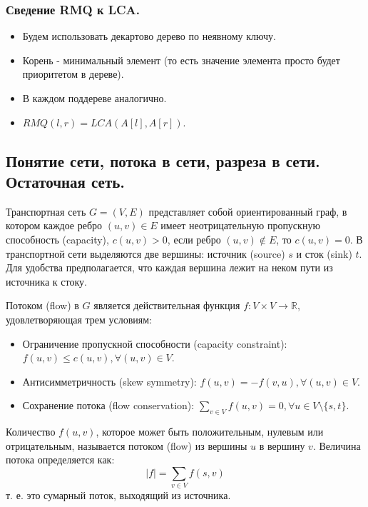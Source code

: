 \documentclass[a4paper,14pt]{article}
\begin{document}
    \subsubsection*{Сведение RMQ к LCA.}
    \begin{itemize}
        \item Будем использовать декартово дерево по неявному ключу.
        \item Корень - минимальный элемент (то есть значение элемента
        просто будет приоритетом в дереве).
        \item В каждом поддереве аналогично.
        \item $RMQ(l,r) = LCA(A[l],A[r])$.
    \end{itemize}

    \subsection{Понятие сети, потока в сети, разреза в сети. Остаточная сеть.}
    \label{subsec:flow_network}
    \begin{Def}
        Транспортная сеть $G = (V,E)$ представляет собой ориентированный
граф, в котором каждое ребро $(u,v) \in E$ имеет неотрицательную
пропускную способность (capacity), $c(u,v) > 0$, если ребро $(u,v) \notin E$,
то $c(u,v) = 0$. В транспортной сети выделяются две вершины:
источник (source) $s$ и сток (sink) $t$. Для удобства предполагается,
что каждая вершина лежит на неком пути из источника к стоку.
    \end{Def}
    \begin{Def}
        Потоком (flow) в $G$ является действительная функция
        $f : V\times V \rightarrow \mathbb{R}$, удовлетворяющая трем условиям:
        \begin{itemize}
            \item Ограничение пропускной способности (capacity constraint): $f(u, v) \leqslant c(u, v), \forall (u, v) \in V$.
            \item Антисимметричность (skew symmetry): $f(u, v) = -f(v, u), \forall (u, v) \in V$.
            \item Сохранение потока (flow conservation): $\sum\limits_{v \in V} f(u, v) = 0, \forall u \in V \setminus \{s, t\}$.
        \end{itemize}
    \end{Def}
    \begin{Def}
        Количество $f(u,v)$, которое может быть положительным, нулевым
или отрицательным, называется потоком (flow) из вершины $u$ в
вершину $v$. Величина потока определяется как:
        \[
        |f| = \sum\limits_{v \in V} f(s, v)
        \]
        т. е. это сумарный поток, выходящий из источника.
    \end{Def}
\end{document}
